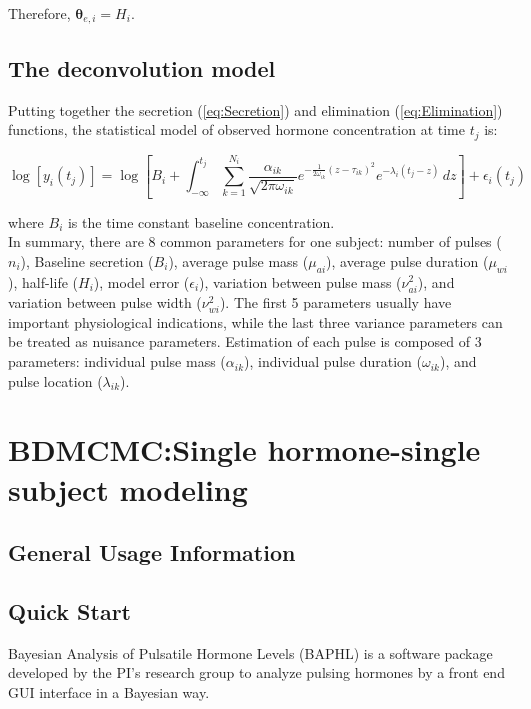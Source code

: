 \documentclass[11pt]{book}
\newcommand{\beq}{\begin{equation}}
\newcommand{\eeq}{\end{equation}}
\begin{document}

Therefore, $\boldsymbol{\theta}_{e,i} = H_i$.

\section{The deconvolution model} Putting together the secretion (\ref{eq:Secretion}) and elimination (\ref{eq:Elimination}) functions, the statistical model of observed hormone concentration at time $t_j$ is:


\beq
\log[y_i(t_j)]=\log\left[B_i + \int_{-\infty}^{t_j} \sum_{k=1}^{N_i}  \frac{\alpha_{ik}}{\sqrt{2\pi\omega_{ik}}}e^{-\frac{1}{2\omega_{ik}}(z-\tau_{ik})^2} e^{-\lambda_i(t_j-z)}\,dz\right]+\epsilon_i(t_j)
\label{eq:DeconModel}
\eeq


\noindent where $B_i$ is the time constant baseline concentration.\\
In summary, there are 8 common parameters for one subject: number of pulses ($n_i$), Baseline secretion ($B_i$), average pulse mass ($\mu_{ai}$), average pulse duration ($\mu_{wi}$), half-life ($H_i$), model error ($\epsilon_i$), variation between pulse mass ($\nu^2_{ai}$), and variation between pulse width ($\nu^2_{wi}$). The first 5 parameters usually have important physiological indications, while the last three variance parameters can be treated as nuisance parameters.  Estimation of each pulse is composed of 3 parameters: individual pulse mass ($\alpha_{ik}$), individual pulse duration ($\omega_{ik}$), and pulse location ($\lambda_{ik}$).














\chapter{BDMCMC:Single hormone-single subject modeling}
\section{General Usage Information}


\section{Quick Start}
Bayesian Analysis of Pulsatile Hormone Levels (BAPHL) is a software package developed by the PI's research group to analyze pulsing hormones by a front end GUI interface in a Bayesian way.
\end{document}
